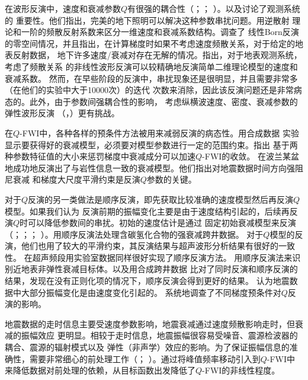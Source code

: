 在波形反演中，速度和衰减参数$Q$有很强的耦合性（；；
）。以及讨论了观测系统的
重要性。他们指出，完美的地下照明可以解决这种参数串扰问题。用逆散射
理论和一阶的频散反射系数来区分一维速度和衰减系数结构。调查了
线性Born反演的零空间情况，并且指出，在计算梯度时如果不考虑速度频散关系，对于给定的地表反射数据，
地下许多速度/衰减对存在无解的情况。指出，对于地表观测系统，考虑了频散关系
的非线性波形反演可以较精确地反演简单二维理论模型的速度和衰减系数。
然而，在早些阶段的反演中，串扰现象还是很明显，并且需要非常多（在他们的实验中大于10000次）的迭代
次数来消除，因此该反演问题还是非常病态的。此外，由于参数间强耦合性的影响，
考虑纵横波速度、密度、衰减参数的弹性波形反演
（，）更有挑战。

在$Q$-FWI中，各种各样的预条件方法被用来减弱反演的病态性。用合成数据
实验显示要获得好的衰减模型，必须要对模型参数进行一定的范围约束。指出
基于两种参数特征值的大小来惩罚梯度中衰减成分可以加速$Q$-FWI的收敛。
在波兰某盆地成功地反演出了与岩性信息一致的衰减模型。他们指出对地震数据时间方向强阻尼衰减
和梯度大尺度平滑约束是反演$Q$参数的关键。

对于$Q$反演的另一类做法是顺序反演，即先获取比较准确的速度模型然后再反演$Q$模型。如果我们认为
反演前期的振幅变化主要是由于速度结构引起的，后续再反演$Q$时可以降低参数间的串扰。初始的速度估计是通过
固定初始衰减模型来反演（；；；
）。用顺序反演法处理含碳氢化合物的强衰减跨井数据。
对于$Q$模型的反演，他们也用了较大的平滑约束，其反演结果与超声波形分析结果有很好的一致性。
在超声频段用实验室数据同样很好实现了顺序反演方法。
用顺序反演法来识别近地表非弹性衰减目标体。以及用合成跨井数据
比对了同时反演和顺序反演的结果，发现在没有正则化项的情况下，顺序反演会得到更好的结果。
认为地震数据中大部分振幅变化是由速度变化引起的。
系统地调查了不同梯度预条件对$Q$反演的影响。

地震数据的走时信息主要受速度参数影响，地震衰减通过速度频散影响走时，但衰减的振幅效应
更明显。相较于走时信息，地震振幅很容易受噪音、震源检波器的耦合、震源的辐射模式以及
弹性（非声学）效应的影响。为了保证振幅信息的准确性，需要非常细心的前处理工作（；
）。通过将峰值频率移动引入到$Q$-FWI中
来降低数据对前处理的依赖，从目标函数出发降低了$Q$-FWI的非线性程度。

